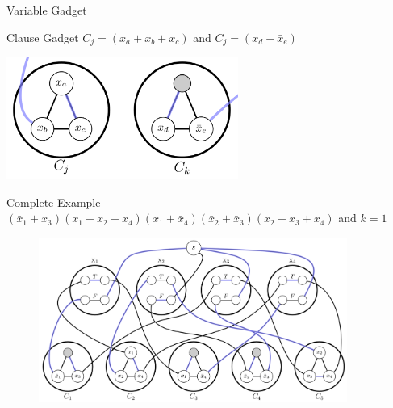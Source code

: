 \begin{frame}{Variable Gadget}
    \begin{minipage}{\linewidth}
        \centering
    \end{minipage}
\end{frame}

\begin{frame}{Clause Gadget}
    \centering
    $C_j = (x_a + x_b + x_c)$ and $C_j = (x_d + \bar x_e)$
    \bigbreak
    \begin{minipage}{\linewidth}
        \centering
        \includegraphics[height=4cm]{images/reduction/clause.png}
    \end{minipage}
\end{frame}

\begin{frame}{Complete Example}
    \centering
    $(\bar{x}_1 + x_3)(x_1 + x_2 + x_4)(x_1 + \bar{x}_4)(\bar{x}_2 + \bar{x}_3)(x_2 + x_3 + x_4)$ and $k=1$
    \begin{figure}
        \centering
        \includegraphics[width=0.9\textwidth]{images/reduction/full.png}
    \end{figure}
\end{frame}
